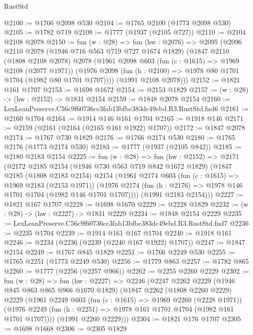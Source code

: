 \begin{lexlean}{RustStd}
\begin{coremodule}
@2100 := @1766 @2098 @530
@2104 := @1765 @2100 (@1773 @2098 @530)
@2105 := @1782 @719
@2108 := @1777 (@1937 (@2105 @727))
@2110 := @2104 @2108 @2078
@2150 := fun (w : @28) =>
  fun (hw : @2076) =>
  @2095
    (@2096
      @2110
      @2078
      (@1946 @716 @563 @719 @727 @1674 @1829)
      (@1847
        @2110
        (@1808 @2108 @2078)
        @2078
        (@1961
          @2098
          @603
          (fun (c : @1615) => @1969 @2108 (@2077 @1971))
          (@1976 @2098 (fun (h : @2100) => @1978 @80 @1701 @1704 (@1982 @80 @1701 @1707))))
        (@1991 @2108 @2078)))
@2152 := @1821 @161 @1707
@2153 := @1698 @1672
@2154 := @2153 @1829
@2157 := (w : @28) -> (hw : @2152) -> @1831 @2154
@2159 := @1848 @2078 @2154
@2160 := LexLeanPreserve.C56c9f60736cc3fab13bfbc383dc49ebd.R3.RustStd.fnd6
@2161 := @2160 @1704
@2164 := @1914 @146 @161 @1704
@2165 := @1918 @146
@2171 := @2159 (@2161 (@2164 (@2165 @161 @1922) @1707))
@2172 := @1847 @2078
@2174 := @1767 @730 @1829
@2176 := @1766 @2174 @530
@2180 := @1765 @2176 (@1773 @2174 @530)
@2183 := @1777 (@1937 (@2105 @842))
@2185 := @2180 @2183 @2154
@2225 := fun (w : @28) =>
  fun (hw : @2152) =>
  @2171
    (@2172
      @2185
      @2154
      (@1946 @730 @563 @719 @842 @1672 @1829)
      (@1847
        @2185
        (@1808 @2183 @2154)
        @2154
        (@1961
          @2174
          @603
          (fun (c : @1615) => @1969 @2183 (@2153 @1971))
          (@1976 @2174 (fun (h : @2176) => @1978 @146 @1701 @1704 (@1982 @146 @1701 @1707))))
        (@1991 @2183 @2154)))
@2227 := @1821 @167 @1707
@2228 := @1698 @1670
@2229 := @2228 @1829
@2232 := (w : @28) -> (hw : @2227) -> @1831 @2229
@2234 := @1848 @2154 @2229
@2235 := LexLeanPreserve.C56c9f60736cc3fab13bfbc383dc49ebd.R3.RustStd.fnd7
@2236 := @2235 @1704
@2239 := @1914 @161 @167 @1704
@2240 := @1918 @161
@2246 := @2234 (@2236 (@2239 (@2240 @167 @1922) @1707))
@2247 := @1847 @2154
@2249 := @1767 @845 @1829
@2251 := @1766 @2249 @530
@2255 := @1765 @2251 (@1773 @2249 @530)
@2256 := @1779 @863
@2257 := @1782 @865
@2260 := @1777 (@2256 (@2257 @966))
@2262 := @2255 @2260 @2229
@2302 := fun (w : @28) =>
  fun (hw : @2227) =>
  @2246
    (@2247
      @2262
      @2229
      (@1946 @845 @863 @865 @966 @1670 @1829)
      (@1847
        @2262
        (@1808 @2260 @2229)
        @2229
        (@1961
          @2249
          @603
          (fun (c : @1615) => @1969 @2260 (@2228 @1971))
          (@1976 @2249 (fun (h : @2251) => @1978 @161 @1701 @1704 (@1982 @161 @1701 @1707))))
        (@1991 @2260 @2229)))
@2304 := @1821 @176 @1707
@2305 := @1698 @1668
@2306 := @2305 @1829

\end{coremodule}
\end{lexlean}
